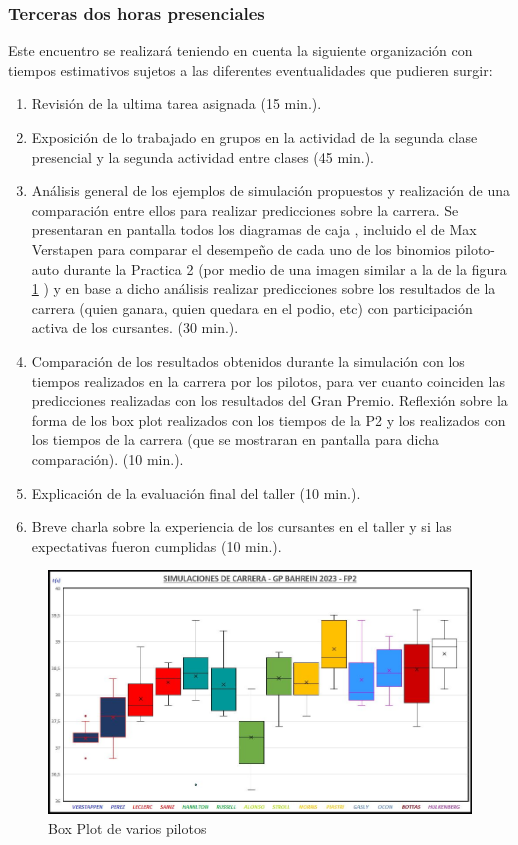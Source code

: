 \subsubsection{Terceras dos horas presenciales}

\noindent Este encuentro se realizará teniendo en cuenta la siguiente organización con tiempos estimativos sujetos a las diferentes eventualidades que pudieren surgir:

\begin{enumerate}
	\item Revisión de la ultima tarea asignada (15 min.).
	
	\item Exposición de lo trabajado en grupos en la actividad de la segunda clase presencial y la segunda actividad entre clases (45 min.).
	
	\item Análisis general de los ejemplos de simulación propuestos y realización de una comparación entre ellos para realizar predicciones sobre la carrera. Se presentaran en pantalla todos los diagramas de caja , incluido el de Max Verstapen para comparar el desempeño de cada uno de los binomios piloto-auto durante la Practica 2 (por medio de una imagen similar a la de la figura \ref{fig:06} ) y en base a dicho análisis realizar predicciones sobre los resultados de la carrera (quien ganara, quien quedara en el podio, etc) con participación activa de los cursantes. (30 min.).
	
	\item Comparación de los resultados obtenidos durante la simulación con los tiempos realizados en la carrera por los pilotos, para ver cuanto coinciden las predicciones realizadas con los resultados del Gran Premio. Reflexión sobre la forma de los box plot realizados con los tiempos de la P2 y los realizados con los tiempos de la carrera (que se mostraran en pantalla para dicha comparación). (10 min.).
	
	\item Explicación de la evaluación final del taller (10 min.). 
	
	\item Breve charla sobre la experiencia de los cursantes en el taller y si las expectativas fueron cumplidas (10 min.).
\end{enumerate}

\begin{figure}[h!]
	\caption{Box Plot de varios pilotos}
	\label{fig:06}
	\includegraphics[width=0.8\linewidth]{Trabajos/01/Anexos/06}
\end{figure}

